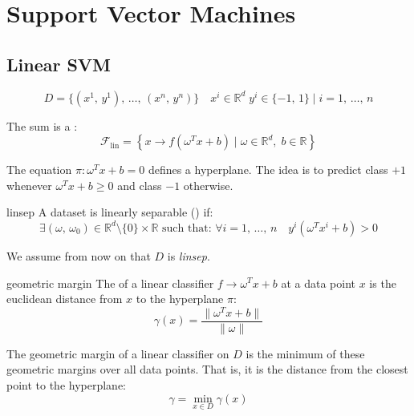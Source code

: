 \chapter[SVMs]{Support Vector Machines}

\section{Linear SVM}
\label{sec:linear-svm}

\begin{equation*}
	D = \{ (x^1,\, y^1),\, \dots,\, (x^n,\, y^n) \} \quad  x^i \in \mathds{R}^d \; y^i \in \{-1,\, 1\} \mid i = 1,\, \dots,\, n
\end{equation*}

The sum is a :
\begin{equation}
	\mathcal{F}_{\text{lin}} = \left\{
    x \to f\left(\omega^Tx + b\right) \mid
    \omega \in \mathds{R}^d,
    \; b \in \mathds{R}
  \right\}
\end{equation}

The equation $\pi : \omega^Tx + b = 0$ defines a hyperplane.
The idea is to predict class $+1$ whenever $\omega^Tx + b \geq 0$ and class $-1$ otherwise.

\begin{definition}{linsep}{}
	A dataset is linearly separable () if:
	\begin{equation*}
		\exists (\omega,\, \omega_0) \in \mathds{R}^d \setminus \{0\} \times \mathds{R}
		\text{ such that: }
		\forall i=1,\,\dots,\,n\quad y^i(\omega^Tx^i +b) > 0
	\end{equation*}
\end{definition}

We assume from now on that $D$ is \emph{linsep}.

\begin{definition}{geometric margin}{}
	The  of a linear
	classifier $f \to \omega^Tx + b$ at a data point $x$ is the
	euclidean distance from $x$ to the hyperplane $\pi$:
	\begin{equation*}
		\gamma(x) = \frac{\lVert\omega^Tx + b\rVert}{\lVert\omega\rVert} \tag{geometric margin at $x$}
	\end{equation*}

  \tcbline

The geometric margin of a linear classifier on $D$ is the minimum of
these geometric margins over all data points. That is, it is the distance
from the closest point to the hyperplane:
\begin{equation*}
	\gamma = \min_{x \in D} \gamma(x) \tag{geometric margin of a linear classifier}
\end{equation*}

\end{definition}

